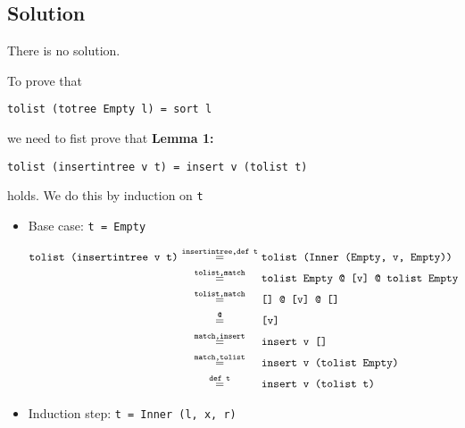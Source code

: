 \subsection*{Solution}

There is no solution.

To prove that
\begin{center}
    \texttt{tolist (totree Empty l) = sort l}
\end{center}
we need to fist prove that
\textbf{Lemma 1:}
\begin{center}
    \texttt{tolist (insertintree v t) = insert v (tolist t)}
\end{center}
holds. We do this by induction on \texttt{t}
\begin{itemize}
    \item {
        Base case: \texttt{t = Empty}

        \begin{displaymath}
            \begin{aligned}
                \texttt{tolist (insertintree v t)}
                &\eq{insertintree,def t}{tolist (Inner (Empty, v, Empty))} \\
                &\eq{tolist,match}{tolist Empty @ [v] @ tolist Empty} \\
                &\eq{tolist,match}{[] @ [v] @ []} \\
                &\eq{@}{[v]} \\
                &\eq{match,insert}{insert v []} \\
                &\eq{match,tolist}{insert v (tolist Empty)} \\
                &\eq{def t}{insert v (tolist t)}
            \end{aligned}
        \end{displaymath}
    }
    \item {
        Induction step: \texttt{t = Inner (l, x, r)}

}
\end{itemize}
